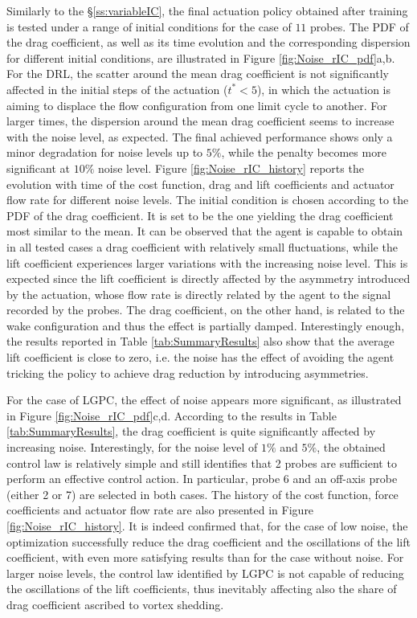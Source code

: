 Similarly to the \S \ref{ss:variableIC}, the final actuation policy obtained after training is tested under a range of initial conditions for the case of $11$ probes. The PDF of the drag coefficient, as well as its time evolution and the corresponding dispersion for different initial conditions, are illustrated in Figure \ref{fig:Noise_rIC_pdf}a,b. For the DRL, the scatter around the mean drag coefficient is not significantly affected in the initial steps of the actuation ($t^*<5$), in which the actuation is aiming to displace the flow configuration from one limit cycle to another. For larger times, the dispersion around the mean drag coefficient seems to increase with the noise level, as expected. The final achieved performance shows only a minor degradation for noise levels up to $5\%$, while the penalty becomes more significant at $10\%$ noise level. 
Figure \ref{fig:Noise_rIC_history} reports the evolution with time of the cost function, drag and lift coefficients and actuator flow rate for different noise levels. The initial condition is chosen according to the PDF of the drag coefficient. It is set to be the one yielding the  drag coefficient most similar to the mean. It can be observed that the agent is capable to obtain in all tested cases a drag coefficient with relatively small fluctuations, while the lift coefficient experiences larger variations with the increasing noise level. This is expected since the lift coefficient is directly affected by the asymmetry introduced by the actuation, whose flow rate is directly related by the agent to the signal recorded by the probes. The drag coefficient, on the other hand, is related to the wake configuration and thus the effect is partially damped. Interestingly enough, the results reported in Table \ref{tab:SummaryResults} also show that the average lift coefficient is close to zero, i.e. the noise has the effect of avoiding the agent tricking the policy to achieve drag reduction by introducing asymmetries.

For the case of LGPC, the effect of noise appears more significant, as illustrated in Figure \ref{fig:Noise_rIC_pdf}c,d. According to the results in Table \ref{tab:SummaryResults}, the drag coefficient is quite significantly affected by increasing noise. Interestingly, for the noise level of $1\%$ and $5\%$, the obtained control law is relatively simple and still identifies that 2 probes are sufficient to perform an effective control action. In particular, probe 6 and an off-axis probe (either 2 or 7) are selected in both cases. The history of the cost function, force coefficients and actuator flow rate are also presented in Figure \ref{fig:Noise_rIC_history}. It is indeed confirmed that, for the case of low noise, the optimization successfully reduce the drag coefficient and the oscillations of the lift coefficient, with even more satisfying results than for the case without noise. For larger noise levels, the control law identified by LGPC is not capable of reducing the oscillations of the lift coefficients, thus inevitably affecting also the share of drag coefficient ascribed to vortex shedding.

